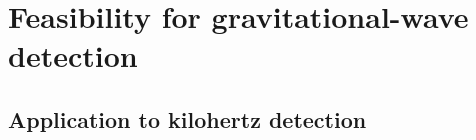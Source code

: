 

\section{Feasibility for gravitational-wave detection}







\subsection{Application to kilohertz detection}

